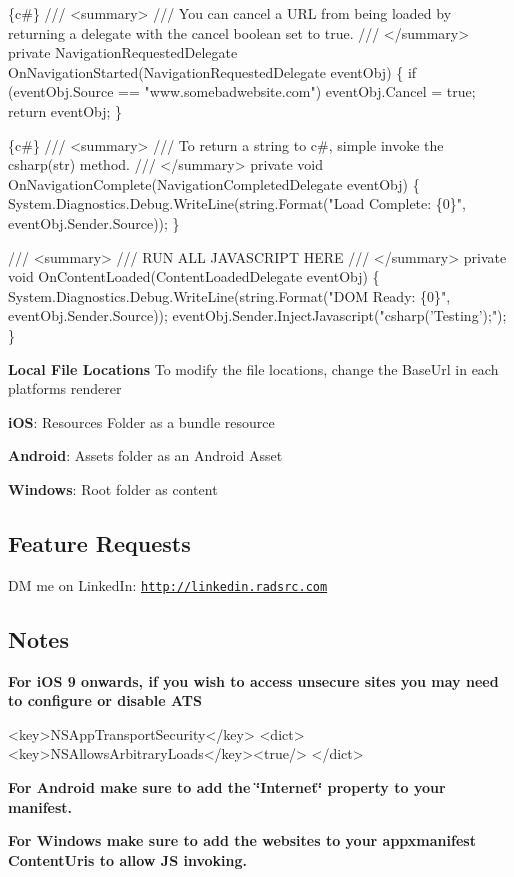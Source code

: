 \begin{DoxyCode}
\{c#\}
/// <summary>
/// You can cancel a URL from being loaded by returning a delegate with the cancel boolean set to true.
/// </summary>
private NavigationRequestedDelegate OnNavigationStarted(NavigationRequestedDelegate eventObj)
\{
    if (eventObj.Source == "www.somebadwebsite.com")
        eventObj.Cancel = true;
    return eventObj;
\}
\end{DoxyCode}



\begin{DoxyCode}
\{c#\}
/// <summary>
/// To return a string to c#, simple invoke the csharp(str) method.
/// </summary>
private void OnNavigationComplete(NavigationCompletedDelegate eventObj)
\{
    System.Diagnostics.Debug.WriteLine(string.Format("Load Complete: \{0\}", eventObj.Sender.Source));
\}

/// <summary>
/// RUN ALL JAVASCRIPT HERE
/// </summary>
private void OnContentLoaded(ContentLoadedDelegate eventObj)
\{
    System.Diagnostics.Debug.WriteLine(string.Format("DOM Ready: \{0\}", eventObj.Sender.Source));
    eventObj.Sender.InjectJavascript("csharp('Testing');");
\}
\end{DoxyCode}


{\bfseries Local File Locations} To modify the file locations, change the Base\+Url in each platforms renderer
\begin{DoxyItemize}
\item {\bfseries i\+OS}\+: Resources Folder as a bundle resource
\item {\bfseries Android}\+: Assets folder as an Android Asset
\item {\bfseries Windows}\+: Root folder as content
\end{DoxyItemize}

\subsection*{Feature Requests}

DM me on Linked\+In\+: \href{http://linkedin.radsrc.com}{\tt http\+://linkedin.\+radsrc.\+com}

\subsection*{Notes}

{\bfseries For i\+OS 9 onwards, if you wish to access unsecure sites you may need to configure or disable A\+TS} 
\begin{DoxyCode}
<key>NSAppTransportSecurity</key>
<dict>
<key>NSAllowsArbitraryLoads</key><true/>
</dict>
\end{DoxyCode}


{\bfseries For Android make sure to add the \char`\"{}\+Internet\char`\"{} property to your manifest.}

{\bfseries For Windows make sure to add the websites to your appxmanifest Content\+Uris to allow JS invoking.} 